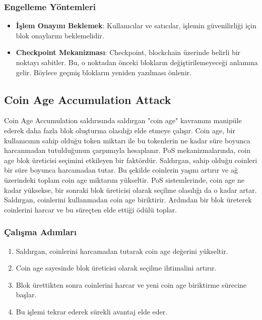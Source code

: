 \subsubsection{Engelleme Yöntemleri}

\begin{itemize}
    \item \textbf{İşlem Onayını Beklemek}: Kullanıcılar ve satıcılar, işlemin güvenilirliği için blok onaylarını beklemelidir.
    \item \textbf{Checkpoint Mekanizması}: Checkpoint, blockchain üzerinde belirli bir noktayı sabitler. Bu, o noktadan önceki blokların değiştirilemeyeceği anlamına gelir. Böylece geçmiş blokların yeniden yazılması önlenir.
\end{itemize}

\newpage

\subsection{Coin Age Accumulation Attack}

Coin Age Accumulation saldırısında saldırgan "coin age" kavramını manipüle ederek daha fazla blok oluşturma olasılığı elde etmeye çalışır. Coin age, bir kullanıcının sahip olduğu token miktarı ile bu tokenlerin ne kadar süre boyunca harcanmadan tutulduğunun çarpımıyla hesaplanır. PoS mekanizmalarında, coin age  blok üreticisi seçimini etkileyen bir faktördür. Saldırgan, sahip olduğu coinleri bir süre boyunca harcamadan tutar. Bu şekilde coinlerin yaşını artırır ve ağ üzerindeki toplam coin age miktarını yükseltir. PoS sistemlerinde, coin age ne kadar yüksekse, bir sonraki blok üreticisi olarak seçilme olasılığı da o kadar artar. Saldırgan, coinlerini kullanmadan coin age biriktirir. Ardından bir blok üreterek coinlerini harcar ve bu süreçten elde ettiği ödülü toplar.

\subsubsection{Çalışma Adımları}

\begin{enumerate}
    \item Saldırgan, coinlerini harcamadan tutarak coin age değerini yükseltir.
    \item Coin age sayesinde blok üreticisi olarak seçilme ihtimalini artırır.
    \item Blok ürettikten sonra coinlerini harcar ve yeni coin age biriktirme sürecine başlar.
    \item Bu işlemi tekrar ederek sürekli avantaj elde eder.
\end{enumerate}


